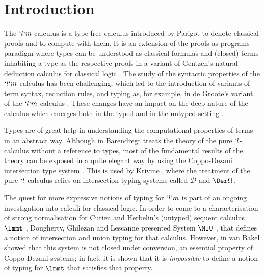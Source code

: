 \documentclass{lmcs}
\begin{document}
% 

 \section*{Introduction} \label{sec:intro}

The $`l`m$-calculus is a type-free calculus introduced by Parigot \cite{Parigot'92} to denote classical proofs and to compute with them. 
It is an extension of the proofs-as-programs paradigm where types can be understood as classical formulas and (closed) terms inhabiting a type as the respective proofs in a variant of Gentzen's natural deduction calculus for classical logic \cite{Gentzen'35}.
The study of the syntactic properties of the $`l`m$-calculus has been challenging, which led to the introduction of variants of term syntax, reduction rules, and typing as, for example, in de Groote's variant of the $`l`m$-calculus \cite{deGroote'94}.
These changes have an impact on the deep nature of the calculus which emerges both in the typed and in the untyped setting \cite{David-Py'01,Saurin'08}.

Types are of great help in understanding the computational properties of terms in an abstract way.
Although in \cite{Barendregt'84} Barendregt treats the theory of the pure $`l$-calculus without a reference to types, most of the fundamental results of the theory can be exposed in a quite elegant way by using the Coppo-Dezani intersection type system \cite{Coppo-Dezani'80}.
This is used by Krivine \cite{Krivine-book'93}, where the treatment of the pure $`l$-calculus relies on intersection typing systems called $ \mathcal D$ and $\Der \Omega$.

The quest for more expressive notions of typing for $`l`m$ is part of an ongoing investigation into calculi for classical logic.
In order to come to a characterisation of strong normalisation for Curien and Herbelin's (untyped) sequent calculus $ \lmmt$ \cite{Curien-Herbelin'00}, Dougherty, Ghilezan and Lescanne presented System $ \MIU$ \cite{DGL-ITRS'04,DGL-CDR'08}, that defines a notion of intersection and union typing for that calculus.
However, in \cite{Bakel-APAL'10} van Bakel showed that this system is not closed under conversion, an essential property of Coppo-Dezani systems; in fact, it is shown that it is \emph{impossible} to define a notion of typing for $ \lmmt$ that satisfies that property.
\end{document}
